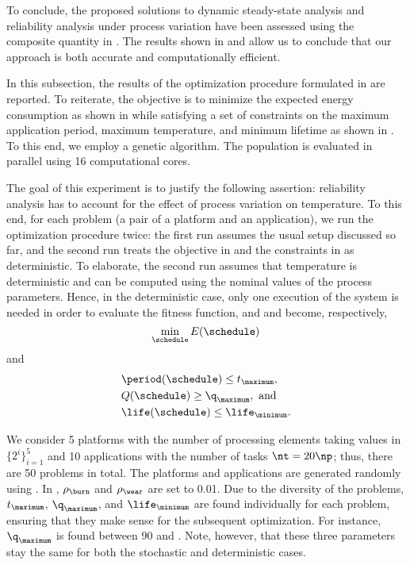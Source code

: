To conclude, the proposed solutions to dynamic steady-state analysis and
reliability analysis under process variation have been assessed using the
composite quantity in . The results shown in
 and  allow us
to conclude that our approach is both accurate and computationally efficient.


In this subsection, the results of the optimization procedure formulated in
 are reported. To reiterate, the objective
is to minimize the expected energy consumption as shown in
 while satisfying a set of constraints on the
maximum application period, maximum temperature, and minimum lifetime as shown
in . To this end, we employ a genetic
algorithm. The population is evaluated in parallel using 16 computational cores.

The goal of this experiment is to justify the following assertion: reliability
analysis has to account for the effect of process variation on temperature. To
this end, for each problem (a pair of a platform and an application), we run the
optimization procedure twice: the first run assumes the usual setup discussed so
far, and the second run treats the objective in
 and the constraints in
 as deterministic. To elaborate, the second
run assumes that temperature is deterministic and can be computed using the
nominal values of the process parameters. Hence, in the deterministic case, only
one execution of the system is needed in order to evaluate the fitness function,
and  and 
become, respectively,
\[
    \min_{\schedule} E(\schedule)
\]
and
\[
  \begin{split}
    & \period(\schedule) \leq t_\maximum, \\
    & Q(\schedule) \geq \q_\maximum, \text{ and} \\
    & \life(\schedule) \leq \life_\minimum.
  \end{split}
\]

We consider 5 platforms with the number of processing elements \np taking values
in $\{ 2^i \}_{i = 1}^5$ and 10 applications with the number of tasks $\nt = 20
\np$; thus, there are 50 problems in total. The platforms and applications are
generated randomly using  \cite{dick1998}. In
, $\rho_\burn$ and $\rho_\wear$ are set to
0.01. Due to the diversity of the problems, $t_\maximum$, $\q_\maximum$, and
$\life_\minimum$ are found individually for each problem, ensuring that they
make sense for the subsequent optimization. For instance, $\q_\maximum$ is found
between 90 and . Note, however, that these three parameters stay
the same for both the stochastic and deterministic cases.

